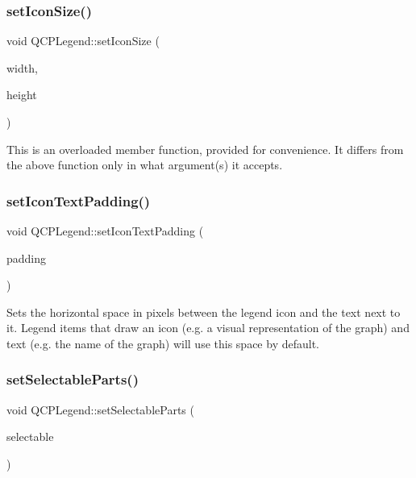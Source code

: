 \subsubsection{\texorpdfstring{set\+Icon\+Size()}{setIconSize()}\hspace{0.1cm}{\footnotesize\ttfamily [2/2]}}
{\footnotesize\ttfamily void Q\+C\+P\+Legend\+::set\+Icon\+Size (\begin{DoxyParamCaption}\item[{int}]{width,  }\item[{int}]{height }\end{DoxyParamCaption})}

This is an overloaded member function, provided for convenience. It differs from the above function only in what argument(s) it accepts. \mbox{\label{class_q_c_p_legend_a62973bd69d5155e8ea3141366e8968f6}} 
\subsubsection{\texorpdfstring{set\+Icon\+Text\+Padding()}{setIconTextPadding()}}
{\footnotesize\ttfamily void Q\+C\+P\+Legend\+::set\+Icon\+Text\+Padding (\begin{DoxyParamCaption}\item[{int}]{padding }\end{DoxyParamCaption})}

Sets the horizontal space in pixels between the legend icon and the text next to it. Legend items that draw an icon (e.\+g. a visual representation of the graph) and text (e.\+g. the name of the graph) will use this space by default. \mbox{\label{class_q_c_p_legend_a9ce60aa8bbd89f62ae4fa83ac6c60110}} 
\subsubsection{\texorpdfstring{set\+Selectable\+Parts()}{setSelectableParts()}}
{\footnotesize\ttfamily void Q\+C\+P\+Legend\+::set\+Selectable\+Parts (\begin{DoxyParamCaption}\item[{const Selectable\+Parts \&}]{selectable }\end{DoxyParamCaption})}

